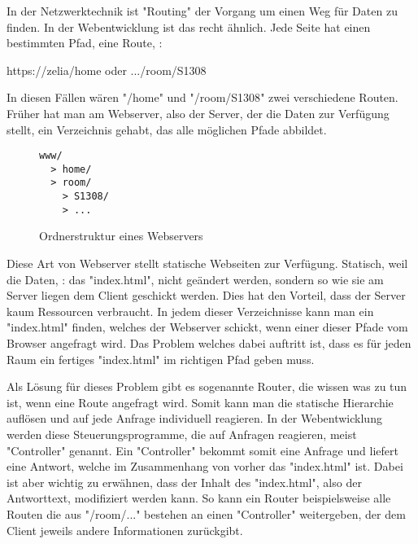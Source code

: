 \label{sec:csrouter}


In der Netzwerktechnik ist "Routing" der Vorgang um einen Weg für Daten zu finden. In der Webentwicklung ist das recht ähnlich. Jede Seite hat einen bestimmten Pfad, eine Route, \zb:

{\ttfamily https://zelia/home} oder {\ttfamily .../room/S1308}

In diesen Fällen wären "{\ttfamily /home}" und "{\ttfamily /room/S1308}" zwei verschiedene Routen. Früher hat man am Webserver, also der Server, der die Daten zur Verfügung stellt, ein Verzeichnis gehabt, das alle möglichen Pfade abbildet.

\begin{figure}[H]
  
  \begin{singlespace}
  \begin{lstlisting}
www/
  > home/
  > room/
    > S1308/
    > ...
    \end{lstlisting}
  \end{singlespace}
    \caption{Ordnerstruktur eines Webservers}
\end{figure}

Diese Art von Webserver stellt statische Webseiten zur Verfügung. Statisch, weil die Daten, \zb: das "{\ttfamily index.html}", nicht geändert werden, sondern so wie sie am Server liegen dem Client geschickt werden. Dies hat den Vorteil, dass der Server kaum Ressourcen verbraucht. In jedem dieser Verzeichnisse kann man ein "{\ttfamily index.html}" finden, welches der Webserver schickt, wenn einer dieser Pfade vom Browser angefragt wird. Das Problem welches dabei auftritt ist, dass es für jeden Raum ein fertiges "{\ttfamily index.html}" im richtigen Pfad geben muss.

Als Lösung für dieses Problem gibt es sogenannte Router, die wissen was zu tun ist, wenn eine Route angefragt wird. Somit kann man die statische Hierarchie auflösen und auf jede Anfrage individuell reagieren. In der Webentwicklung werden diese Steuerungsprogramme, die auf Anfragen reagieren, meist "Controller" genannt. Ein "Controller" bekommt somit eine Anfrage und liefert eine Antwort, welche im Zusammenhang von vorher das "{\ttfamily index.html}" ist. Dabei ist aber wichtig zu erwähnen, dass der Inhalt des "{\ttfamily index.html}", also der Antworttext, modifiziert werden kann. So kann ein Router beispielsweise alle Routen die aus "{\ttfamily /room/...}" bestehen an einen "Controller" weitergeben, der dem Client jeweils andere Informationen zurückgibt.

